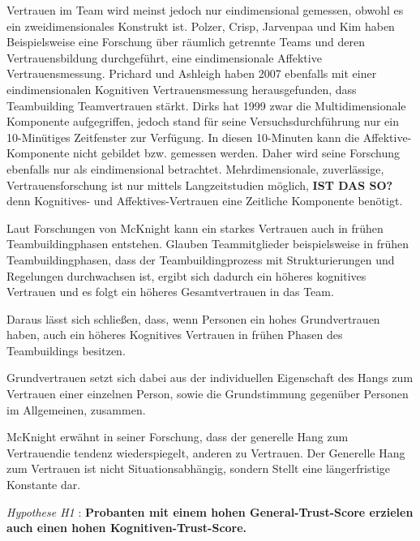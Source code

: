 \documentclass[a4paper,11pt]{article}%
\renewcommand{\\}{\vspace*{0.5\baselineskip} \newline}
\begin{document}
Vertrauen im Team wird meinst jedoch nur eindimensional gemessen, obwohl es ein zweidimensionales Konstrukt ist.
Polzer, Crisp, Jarvenpaa und Kim haben Beispielsweise eine Forschung über räumlich getrennte Teams und deren Vertrauensbildung durchgeführt, eine eindimensionale Affektive Vertrauensmessung. \citep[p.682]{polzer2006extending}
Prichard und Ashleigh haben 2007 ebenfalls mit einer eindimensionalen Kognitiven Vertrauensmessung herausgefunden, dass Teambuilding Teamvertrauen stärkt. \citep[p.704]{prichard2007effects}
Dirks hat 1999 zwar die Multidimensionale Komponente aufgegriffen, jedoch stand für seine Versuchsdurchführung nur ein 10-Minütiges Zeitfenster zur Verfügung. In diesen 10-Minuten kann die Affektive-Komponente nicht gebildet bzw. gemessen werden. \citep[p.445]{mayer1995integrative} Daher wird seine Forschung ebenfalls nur als eindimensional betrachtet.
Mehrdimensionale, zuverlässige, Vertrauensforschung ist nur mittels Langzeitstudien möglich, \textbf{ IST DAS SO?}denn Kognitives- und Affektives-Vertrauen eine Zeitliche Komponente benötigt. \citep{jones1998experience} \\

Laut Forschungen von McKnight kann ein starkes Vertrauen auch in frühen Teambuildingphasen entstehen. Glauben Teammitglieder beispielsweise in frühen Teambuildingphasen, dass der Teambuildingprozess mit Strukturierungen und Regelungen durchwachsen ist, ergibt sich dadurch ein höheres kognitives Vertrauen und es folgt ein höheres Gesamtvertrauen in das Team.
\citep[p.478-479]{mcknight1998initial} \\

Daraus lässt sich schließen, dass, wenn Personen ein hohes Grundvertrauen haben, auch ein höheres Kognitives Vertrauen in frühen Phasen des Teambuildings besitzen. \\

Grundvertrauen setzt sich dabei aus der individuellen Eigenschaft des Hangs zum Vertrauen einer einzelnen Person, sowie die Grundstimmung gegenüber Personen im Allgemeinen, zusammen. \citep{couch1996assessment} \\

McKnight \citep[p.6]{mcknight2011trust} erwähnt in seiner Forschung, dass der \glqq generelle Hang zum Vertrauen\grqq die tendenz wiederspiegelt, anderen zu Vertrauen. Der Generelle Hang zum Vertrauen ist nicht Situationsabhängig, sondern Stellt eine längerfristige Konstante dar.

\textit{Hypothese H1} : \textbf{Probanten mit einem hohen General-Trust-Score erzielen auch einen hohen Kognitiven-Trust-Score.}
\\
\end{document}

